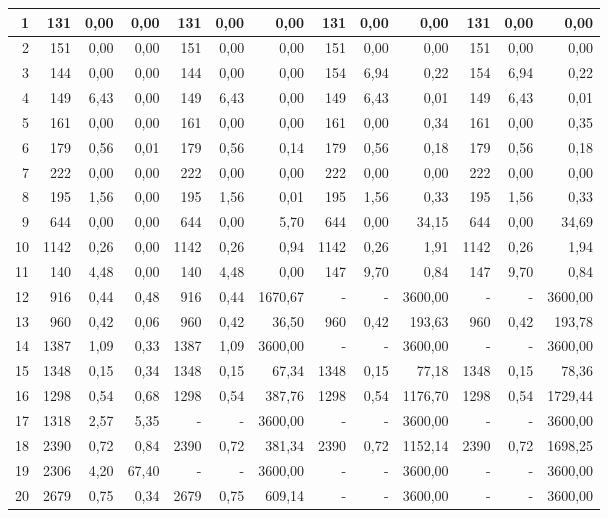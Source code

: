 \begin{table}[H]
\begin{tabular}{|r|rrr|rrr|rrr|rrr|}
1	&	131	&	0,00	&	0,00	&	131	&	0,00	&	0,00	&	131	&	0,00	&	0,00	&	131	&	0,00	&	0,00	\\ \hline
2	&	151	&	0,00	&	0,00	&	151	&	0,00	&	0,00	&	151	&	0,00	&	0,00	&	151	&	0,00	&	0,00	\\ \hline
3	&	144	&	0,00	&	0,00	&	144	&	0,00	&	0,00	&	154	&	6,94	&	0,22	&	154	&	6,94	&	0,22	\\ \hline
4	&	149	&	6,43	&	0,00	&	149	&	6,43	&	0,00	&	149	&	6,43	&	0,01	&	149	&	6,43	&	0,01	\\ \hline
5	&	161	&	0,00	&	0,00	&	161	&	0,00	&	0,00	&	161	&	0,00	&	0,34	&	161	&	0,00	&	0,35	\\ \hline
6	&	179	&	0,56	&	0,01	&	179	&	0,56	&	0,14	&	179	&	0,56	&	0,18	&	179	&	0,56	&	0,18	\\ \hline
7	&	222	&	0,00	&	0,00	&	222	&	0,00	&	0,00	&	222	&	0,00	&	0,00	&	222	&	0,00	&	0,00	\\ \hline
8	&	195	&	1,56	&	0,00	&	195	&	1,56	&	0,01	&	195	&	1,56	&	0,33	&	195	&	1,56	&	0,33	\\ \hline
9	&	644	&	0,00	&	0,00	&	644	&	0,00	&	5,70	&	644	&	0,00	&	34,15	&	644	&	0,00	&	34,69	\\ \hline
10	&	1142	&	0,26	&	0,00	&	1142	&	0,26	&	0,94	&	1142	&	0,26	&	1,91	&	1142	&	0,26	&	1,94	\\ \hline
11	&	140	&	4,48	&	0,00	&	140	&	4,48	&	0,00	&	147	&	9,70	&	0,84	&	147	&	9,70	&	0,84	\\ \hline
12	&	916	&	0,44	&	0,48	&	916	&	0,44	&	1670,67	&	-	&	-	&	3600,00	&	-	&	-	&	3600,00	\\ \hline
13	&	960	&	0,42	&	0,06	&	960	&	0,42	&	36,50	&	960	&	0,42	&	193,63	&	960	&	0,42	&	193,78	\\ \hline
14	&	1387	&	1,09	&	0,33	&	1387	&	1,09	&	3600,00	&	-	&	-	&	3600,00	&	-	&	-	&	3600,00	\\ \hline
15	&	1348	&	0,15	&	0,34	&	1348	&	0,15	&	67,34	&	1348	&	0,15	&	77,18	&	1348	&	0,15	&	78,36	\\ \hline
16	&	1298	&	0,54	&	0,68	&	1298	&	0,54	&	387,76	&	1298	&	0,54	&	1176,70	&	1298	&	0,54	&	1729,44	\\ \hline
17	&	1318	&	2,57	&	5,35	&	-	&	-	&	3600,00	&	-	&	-	&	3600,00	&	-	&	-	&	3600,00	\\ \hline
18	&	2390	&	0,72	&	0,84	&	2390	&	0,72	&	381,34	&	2390	&	0,72	&	1152,14	&	2390	&	0,72	&	1698,25	\\ \hline
19	&	2306	&	4,20	&	67,40	&	-	&	-	&	3600,00	&	-	&	-	&	3600,00	&	-	&	-	&	3600,00	\\ \hline
20	&	2679	&	0,75	&	0,34	&	2679	&	0,75	&	609,14	&	-	&	-	&	3600,00	&	-	&	-	&	3600,00	\\ \hline

\end{tabular}
\end{table}
